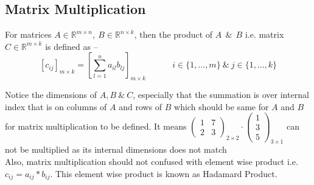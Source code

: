 \documentclass{article}
\begin{document}
\subsection{Matrix Multiplication}

For matrices \(  A \in \mathbb{R}^{m\times n},~B \in \mathbb{R}^{n\times k} \), then the product of \(A~~\&~~B\) i.e. matrix \( C \in \mathbb{R}^{m\times k} \) is defined as -- \\

\[
    [c_{ij}]_{m\times k} = [ \sum_{l=1}^{n} a_{il} b_{lj} ]_{m\times k}~~~~~~~~~~~~~~ i \in \{1,...,m\} ~ \& ~ j \in \{1,...,k\}
\]

Notice the dimensions of \(A, B~\&~C\), especially that the summation is over internal index that is on columns of \(A\) and rows of \(B\) which should be same for \(A\) and \(B\) for matrix multiplication to be defined. It means \(\begin{pmatrix}
                                        1 & 7\\
                                        2 & 3
                                   \end{pmatrix}_{2\times 2} \cdot \begin{pmatrix}
                                                        1\\
                                                        3\\
                                                        5
                                                   \end{pmatrix}_{3 \times 1}\) can not be multiplied as its internal dimensions does not match\\


Also, matrix multiplication should not confused with element wise product i.e. \( c_{ij} = a_{ij} * b_{ij} \). This element wise product is known as Hadamard Product. \\
\end{document}
